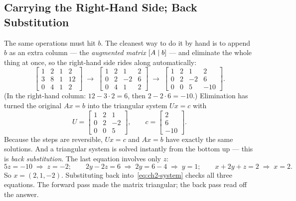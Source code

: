 
\subsection{Carrying the Right-Hand Side; Back Substitution}

The same operations must hit $b$. The cleanest way to do it by hand is to append $b$ as an extra column --- the \emph{augmented matrix} $\left[A \mid b\right]$ --- and eliminate the whole thing at once, so the right-hand side rides along automatically:
\[
\left[\begin{array}{ccc|c} 1 & 2 & 1 & 2\\ 3 & 8 & 1 & 12\\ 0 & 4 & 1 & 2\end{array}\right]
\;\longrightarrow\;
\left[\begin{array}{ccc|c} 1 & 2 & 1 & 2\\ 0 & 2 & -2 & 6\\ 0 & 4 & 1 & 2\end{array}\right]
\;\longrightarrow\;
\left[\begin{array}{ccc|c} 1 & 2 & 1 & 2\\ 0 & 2 & -2 & 6\\ 0 & 0 & 5 & -10\end{array}\right].
\]
(In the right-hand column: $12-3\cdot 2 = 6$, then $2-2\cdot 6 = -10$.) Elimination has turned the original $Ax=b$ into the triangular system $Ux=c$ with
\[
U=\begin{bmatrix} 1 & 2 & 1\\ 0 & 2 & -2\\ 0 & 0 & 5\end{bmatrix},
\qquad
c=\begin{bmatrix} 2\\ 6\\ -10\end{bmatrix}.
\]
Because the steps are reversible, $Ux=c$ and $Ax=b$ have exactly the same solutions. And a triangular system is solved instantly from the bottom up --- this is \emph{back substitution}. The last equation involves only $z$:
\[
5z=-10 \;\Rightarrow\; z=-2;\qquad
2y-2z=6 \;\Rightarrow\; 2y=6-4 \;\Rightarrow\; y=1;\qquad
x+2y+z=2 \;\Rightarrow\; x=2.
\]
So $x=(2,1,-2)$. Substituting back into~\eqref{eq:ch2-system} checks all three equations. The forward pass made the matrix triangular; the back pass read off the answer.

